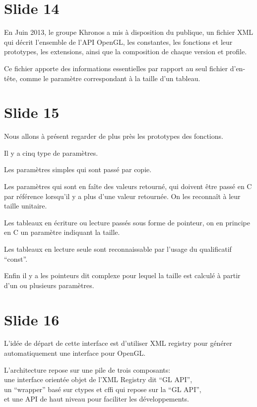 \documentclass[12pt]{article}
\begin{document}

\section{Slide 14}

En Juin 2013, le groupe Khronos a mis à disposition du publique, un fichier XML qui décrit
l'ensemble de l'API OpenGL, les constantes, les fonctions et leur prototypes, les extensions, ainsi
que la composition de chaque version et profile. %

Ce fichier apporte des informations essentielles par rapport au seul fichier d'en-tête, comme le
paramètre correspondant à la taille d'un tableau.

\section{Slide 15}

Nous allons à présent regarder de plus près les prototypes des fonctions.

Il y a cinq type de paramètres.

Les paramètres simples qui sont passé par copie.

Les paramètres qui sont en faîte des valeurs retourné, qui doivent être passé en C par référence
lorsqu'il y a plus d'une valeur retournée. On les reconnaît à leur taille unitaire.

Les tableaux en écriture ou lecture passés sous forme de pointeur, on en principe en C un paramètre
indiquant la taille.

Les tableaux en lecture seule sont reconnaissable par l'usage du qualificatif ``const''.

Enfin il y a les pointeurs dit complexe pour lequel la taille est calculé à partir d'un ou plusieurs paramètres.

\section{Slide 16}

L'idée de départ de cette interface est d'utiliser XML registry pour générer automatiquement une
interface pour OpenGL.

L'architecture repose sur une pile de trois composants: \\
  une interface orientée objet de l'XML Registry dit ``GL API'', \\
  un ``wrapper'' basé sur ctypes et cffi qui repose sur la ``GL API'', \\
  et une API de haut niveau pour faciliter les développements.
\end{document}
